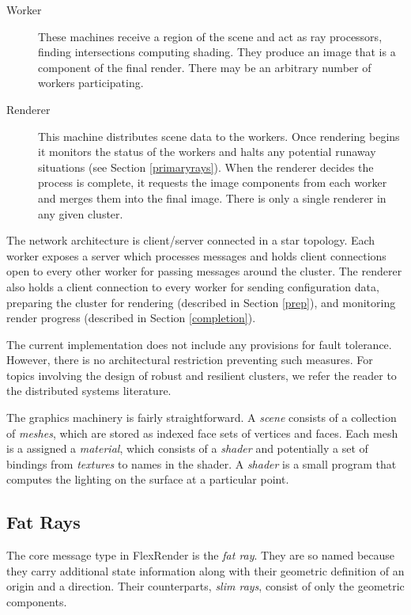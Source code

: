\documentclass[a4paper,twoside]{article}
\begin{document}
\begin{description}
    \item[Worker] These machines receive a region of the scene and act as ray
        processors, finding intersections computing shading. They produce an
        image that is a component of the final render. There may be an
        arbitrary number of workers participating.
    \item[Renderer] This machine distributes scene data to the workers. Once
        rendering begins it monitors the status of the workers and halts any
        potential runaway situations (see Section \ref{primaryrays}). When the
        renderer decides the process is complete, it requests the image
        components from each worker and merges them into the final image.
        There is only a single renderer in any given cluster.
\end{description}

The network architecture is client/server connected in a star topology. Each
worker exposes a server which processes messages and holds client connections
open to every other worker for passing messages around the cluster. The renderer
also holds a client connection to every worker for sending configuration data,
preparing the cluster for rendering (described in Section \ref{prep}), and
monitoring render progress (described in Section \ref{completion}).

The current implementation does not include any provisions for fault tolerance.
However, there is no architectural restriction preventing such measures. For
topics involving the design of robust and resilient clusters, we refer the
reader to the distributed systems literature.

The graphics machinery is fairly straightforward. A \emph{scene} consists of a
collection of \emph{meshes}, which are stored as indexed face sets of vertices
and faces. Each mesh is a assigned a \emph{material}, which consists of a
\emph{shader} and potentially a set of bindings from \emph{textures} to names
in the shader. A \emph{shader} is a small program that computes the lighting on
the surface at a particular point.

\subsection{Fat Rays}
\label{fatrays}

The core message type in FlexRender is the \emph{fat ray}. They are so named
because they carry additional state information along with their geometric
definition of an origin and a direction. Their counterparts, \emph{slim rays},
consist of only the geometric components.
\end{document}
